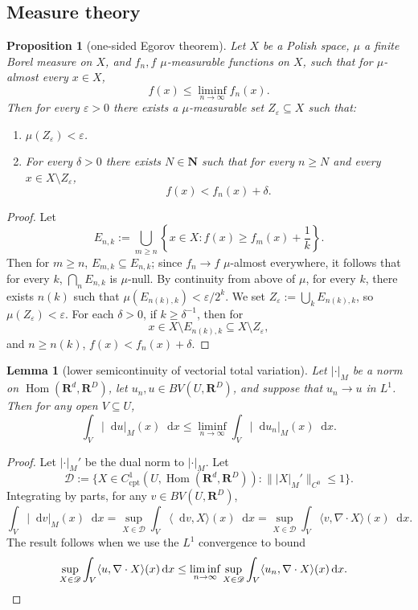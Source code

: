 \documentclass[reqno,11pt]{amsart}
\newcommand{\NN}{\mathbf{N}}
\newcommand{\RR}{\mathbf{R}}
\newcommand*\dif{\mathop{}\!\mathrm{d}}
\DeclareMathOperator{\Hom}{Hom}
\newcommand{\cpt}{\mathrm{cpt}}
\newtheorem{lemma}[theorem]{Lemma}
\newtheorem{proposition}[theorem]{Proposition}
\theoremstyle{definition}
\numberwithin{equation}{section}
\begin{document}
\subsection{Measure theory}
\begin{proposition}[one-sided Egorov theorem]\label{one sided Egorov}
Let $X$ be a Polish space, $\mu$ a finite Borel measure on $X$, and $f_n, f$ $\mu$-measurable functions on $X$, such that for $\mu$-almost every $x \in X$,
$$f(x) \leq \liminf_{n \to \infty} f_n(x).$$
Then for every $\varepsilon > 0$ there exists a $\mu$-measurable set $Z_\varepsilon \subseteq X$ such that:
\begin{enumerate}
\item $\mu(Z_\varepsilon) < \varepsilon$.
\item For every $\delta > 0$ there exists $N \in \NN$ such that for every $n \geq N$ and every $x \in X \setminus Z_\varepsilon$,
$$f(x) < f_n(x) + \delta.$$
\end{enumerate}
\end{proposition}
\begin{proof}
Let 
$$E_{n, k} := \bigcup_{m \geq n} \left\{x \in X: f(x) \geq f_m(x) + \frac{1}{k}\right\}.$$
Then for $m \geq n$, $E_{m, k} \subseteq E_{n, k}$; since $f_n \to f$ $\mu$-almost everywhere, it follows that for every $k$, $\bigcap_n E_{n, k}$ is $\mu$-null.
By continuity from above of $\mu$, for every $k$, there exists $n(k)$ such that $\mu(E_{n(k), k}) < \varepsilon/2^k$.
We set $Z_\varepsilon := \bigcup_k E_{n(k), k}$, so $\mu(Z_\varepsilon) < \varepsilon$.
For each $\delta > 0$, if $k \geq \delta^{-1}$, then for
$$x \in X \setminus E_{n(k), k} \subseteq X \setminus Z_\varepsilon,$$
and $n \geq n(k)$, $f(x) < f_n(x) + \delta$.
\end{proof}

\begin{lemma}[lower semicontinuity of vectorial total variation]\label{TV lower semicontinuity}
Let $|\cdot|_M$ be a norm on $\Hom(\RR^d, \RR^D)$, let $u_n, u \in BV(U, \RR^D)$, and suppose that $u_n \to u$ in $L^1$.
Then for any open $V \subseteq U$,
$$\int_V |\dif u|_M(x) \dif x \leq \liminf_{n \to \infty} \int_V |\dif u_n|_M(x) \dif x.$$
\end{lemma}
\begin{proof}
Let $|\cdot|_M'$ be the dual norm to $|\cdot|_M$.
Let
$$\mathscr D := \{X \in C^1_\cpt(U, \Hom(\RR^d, \RR^D)): \||X|_M'\|_{C^0} \leq 1\}.$$
Integrating by parts, for any $v \in BV(U, \RR^D)$, 
$$\int_V |\dif v|_M(x) \dif x = \sup_{X \in \mathscr D} \int_V \langle \dif v, X\rangle(x) \dif x = \sup_{X \in \mathscr D} \int_V \langle v, \nabla \cdot X\rangle(x) \dif x.$$
The result follows when we use the $L^1$ convergence to bound
\begin{align*}
\sup_{X \in \mathscr D} \int_V \langle u, \nabla \cdot X\rangle(x) \dif x 
&\leq \liminf_{n \to \infty} \sup_{X \in \mathscr D} \int_V \langle u_n, \nabla \cdot X\rangle(x) \dif x. \qedhere
\end{align*}
\end{proof}
\end{document}
